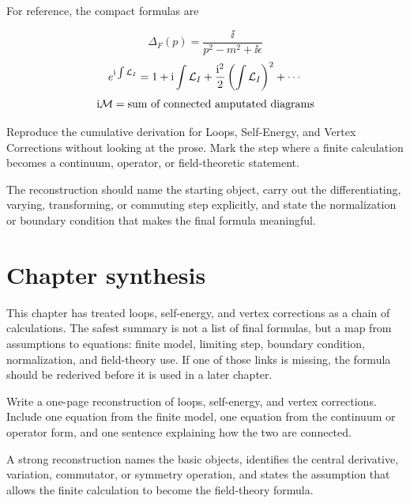 For reference, the compact formulas are

\[
  \Delta_F(p)=\frac{\ii}{p^2-m^2+\ii\epsilon}
\]
\[
  e^{\mathrm i\int\mathcal L_I}=1+\mathrm i\int\mathcal L_I+\frac{\mathrm i^2}{2}\left(\int\mathcal L_I\right)^2+\cdots
\]
\[
  \mathrm i\mathcal M=\hbox{sum of connected amputated diagrams}
\]

\begin{exercise}
Reproduce the cumulative derivation for Loops, Self-Energy, and Vertex Corrections without looking at the prose.  Mark the step where a finite calculation becomes a continuum, operator, or field-theoretic statement.
\begin{answer}
The reconstruction should name the starting object, carry out the differentiating, varying, transforming, or commuting step explicitly, and state the normalization or boundary condition that makes the final formula meaningful.
\end{answer}
\end{exercise}



\section{Chapter synthesis}

This chapter has treated loops, self-energy, and vertex corrections as a chain of calculations.  The safest summary is not a list of final formulas, but a map from assumptions to equations: finite model, limiting step, boundary condition, normalization, and field-theory use.  If one of those links is missing, the formula should be rederived before it is used in a later chapter.

\begin{exercise}
Write a one-page reconstruction of loops, self-energy, and vertex corrections.  Include one equation from the finite model, one equation from the continuum or operator form, and one sentence explaining how the two are connected.
\begin{answer}
A strong reconstruction names the basic objects, identifies the central derivative, variation, commutator, or symmetry operation, and states the assumption that allows the finite calculation to become the field-theory formula.
\end{answer}
\end{exercise}
